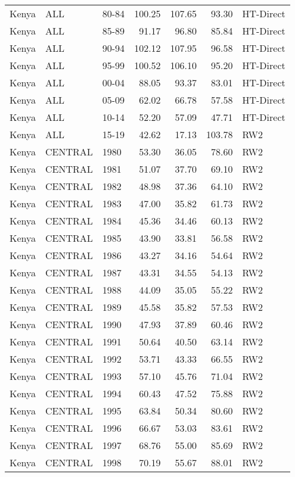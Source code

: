 \begin{longtable}{lllrrrl}
  Kenya & ALL & 80-84 & 100.25 & 107.65 & 93.30 & HT-Direct \\ 
  Kenya & ALL & 85-89 & 91.17 & 96.80 & 85.84 & HT-Direct \\ 
  Kenya & ALL & 90-94 & 102.12 & 107.95 & 96.58 & HT-Direct \\ 
  Kenya & ALL & 95-99 & 100.52 & 106.10 & 95.20 & HT-Direct \\ 
  Kenya & ALL & 00-04 & 88.05 & 93.37 & 83.01 & HT-Direct \\ 
  Kenya & ALL & 05-09 & 62.02 & 66.78 & 57.58 & HT-Direct \\ 
  Kenya & ALL & 10-14 & 52.20 & 57.09 & 47.71 & HT-Direct \\ 
  Kenya & ALL & 15-19 & 42.62 & 17.13 & 103.78 & RW2 \\ 
  Kenya & CENTRAL & 1980 & 53.30 & 36.05 & 78.60 & RW2 \\ 
  Kenya & CENTRAL & 1981 & 51.07 & 37.70 & 69.10 & RW2 \\ 
  Kenya & CENTRAL & 1982 & 48.98 & 37.36 & 64.10 & RW2 \\ 
  Kenya & CENTRAL & 1983 & 47.00 & 35.82 & 61.73 & RW2 \\ 
  Kenya & CENTRAL & 1984 & 45.36 & 34.46 & 60.13 & RW2 \\ 
  Kenya & CENTRAL & 1985 & 43.90 & 33.81 & 56.58 & RW2 \\ 
  Kenya & CENTRAL & 1986 & 43.27 & 34.16 & 54.64 & RW2 \\ 
  Kenya & CENTRAL & 1987 & 43.31 & 34.55 & 54.13 & RW2 \\ 
  Kenya & CENTRAL & 1988 & 44.09 & 35.05 & 55.22 & RW2 \\ 
  Kenya & CENTRAL & 1989 & 45.58 & 35.82 & 57.53 & RW2 \\ 
  Kenya & CENTRAL & 1990 & 47.93 & 37.89 & 60.46 & RW2 \\ 
  Kenya & CENTRAL & 1991 & 50.64 & 40.50 & 63.14 & RW2 \\ 
  Kenya & CENTRAL & 1992 & 53.71 & 43.33 & 66.55 & RW2 \\ 
  Kenya & CENTRAL & 1993 & 57.10 & 45.76 & 71.04 & RW2 \\ 
  Kenya & CENTRAL & 1994 & 60.43 & 47.52 & 75.88 & RW2 \\ 
  Kenya & CENTRAL & 1995 & 63.84 & 50.34 & 80.60 & RW2 \\ 
  Kenya & CENTRAL & 1996 & 66.67 & 53.03 & 83.61 & RW2 \\ 
  Kenya & CENTRAL & 1997 & 68.76 & 55.00 & 85.69 & RW2 \\ 
  Kenya & CENTRAL & 1998 & 70.19 & 55.67 & 88.01 & RW2 \\ 

\end{longtable}
